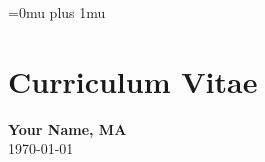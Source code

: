 \documentclass[12pt, letterpaper]{report}   %
\begin{document}




\newpage
\singlespace
\Urlmuskip=0mu plus 1mu\relax %




\chapter*{Curriculum Vitae}
\thispagestyle{empty}
\begin{large}
\begin{center}
\textbf{Your Name, MA}\\ 
\today\\
\end{center}
\end{large}
\end{document}

